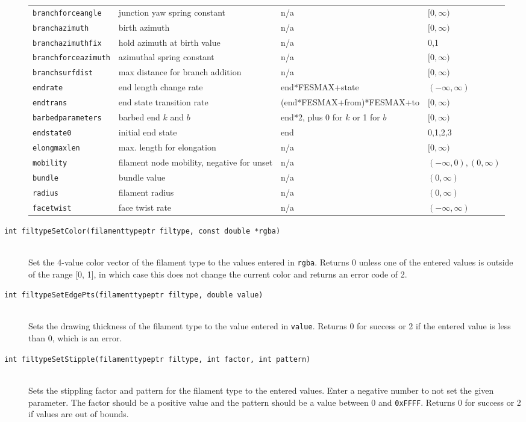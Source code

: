 \documentclass {scrbook}
\newcommand {\ttt} {\texttt}
\begin{document}
\begin{description}
{\begin{longtable}[c]{llll}
\ttt{branchforceangle} & junction yaw spring constant & n/a & $[0,\infty)$ \\
\ttt{branchazimuth} & birth azimuth & n/a & $[0,\infty)$ \\
\ttt{branchazimuthfix} & hold azimuth at birth value & n/a & 0,1 \\
\ttt{branchforceazimuth} & azimuthal spring constant & n/a & $[0,\infty)$ \\
\ttt{branchsurfdist} & max distance for branch addition & n/a & $[0,\infty)$ \\
\ttt{endrate} & end length change rate & end*FESMAX+state & $(-\infty,\infty)$ \\
\ttt{endtrans} & end state transition rate & (end*FESMAX+from)*FESMAX+to & $[0,\infty)$ \\
\ttt{barbedparameters} & barbed end $k$ and $b$ & end*2, plus 0 for $k$ or 1 for $b$ & $[0,\infty)$ \\
\ttt{endstate0} & initial end state & end & 0,1,2,3 \\
\ttt{elongmaxlen} & max. length for elongation & n/a & $[0,\infty)$ \\ 
\ttt{mobility} & filament node mobility, negative for unset & n/a & $(-\infty,0),(0,\infty)$\\
\ttt{bundle} & bundle value & n/a & $(0,\infty)$\\
\ttt{radius} & filament radius & n/a & $(0,\infty)$\\
\ttt{facetwist} & face twist rate & n/a & $(-\infty,\infty)$
\end{longtable} }

\item[\ttt{int filtypeSetColor(filamenttypeptr filtype, const double *rgba)}]
\hfill \\
Set the 4-value color vector of the filament type to the values entered in \ttt{rgba}. Returns 0 unless one of the entered values is outside of the range [0, 1], in which case this does not change the current color and returns an error code of 2.

\item[\ttt{int filtypeSetEdgePts(filamenttypeptr filtype, double value)}]
\hfill \\
Sets the drawing thickness of the filament type to the value entered in \ttt{value}. Returns 0 for success or 2 if the entered value is less than 0, which is an error.

\item[\ttt{int filtypeSetStipple(filamenttypeptr filtype, int factor, int pattern)}]
\hfill \\
Sets the stippling factor and pattern for the filament type to the entered values. Enter a negative number to not set the given parameter. The factor should be a positive value and the pattern should be a value between 0 and \ttt{0xFFFF}. Returns 0 for success or 2 if values are out of bounds.


\end{description}
\end{document}
